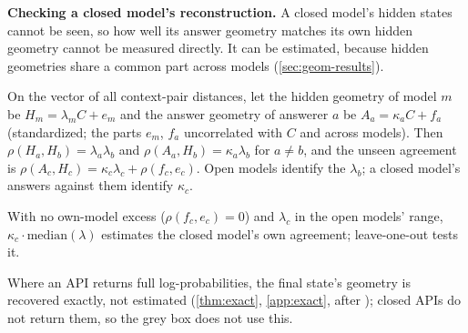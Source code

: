 \textbf{Checking a closed model's reconstruction.} A closed model's hidden states cannot be seen, so how well its answer geometry matches its own hidden geometry cannot be measured directly. It can be estimated, because hidden geometries share a common part across models (\cref{sec:geom-results}).
\begin{proposition}[triangulation]\label{prop:triang}
On the vector of all context-pair distances, let the hidden geometry of model $m$ be $H_m=\lambda_mC+e_m$ and the answer geometry of answerer $a$ be $A_a=\kappa_aC+f_a$ (standardized; the parts $e_m$, $f_a$ uncorrelated with $C$ and across models). Then $\rho(H_a,H_b)=\lambda_a\lambda_b$ and $\rho(A_a,H_b)=\kappa_a\lambda_b$ for $a\neq b$, and the unseen agreement is $\rho(A_c,H_c)=\kappa_c\lambda_c+\rho(f_c,e_c)$. Open models identify the $\lambda_b$; a closed model's answers against them identify $\kappa_c$.
\end{proposition}
With no own-model excess ($\rho(f_c,e_c)=0$) and $\lambda_c$ in the open models' range, $\kappa_c\cdot\mathrm{median}(\lambda)$ estimates the closed model's own agreement; leave-one-out tests it.

Where an API returns full log-probabilities, the final state's geometry is recovered exactly, not estimated (\cref{thm:exact}, \cref{app:exact}, after \citet[App.~H]{carlini2024stealing}); closed APIs do not return them, so the grey box does not use this.

